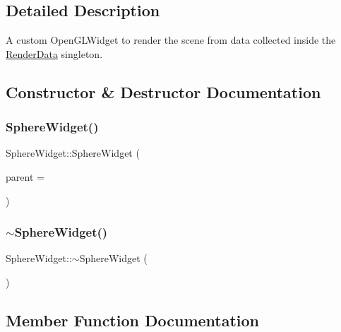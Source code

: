 \subsection{Detailed Description}
A custom Open\+G\+L\+Widget to render the scene from data collected inside the \hyperlink{class_render_data}{Render\+Data} singleton. 

\subsection{Constructor \& Destructor Documentation}
\mbox{\label{class_sphere_widget_a6ee7b3a4b58e5d62fb1c901aafdd1790}} 
\subsubsection{\texorpdfstring{Sphere\+Widget()}{SphereWidget()}}
{\footnotesize\ttfamily Sphere\+Widget\+::\+Sphere\+Widget (\begin{DoxyParamCaption}\item[{Q\+Widget $\ast$}]{parent = {} }\end{DoxyParamCaption})}

\mbox{\label{class_sphere_widget_a1766e5d68f4c57f52d6b1ee40cc0326c}} 
\subsubsection{\texorpdfstring{$\sim$\+Sphere\+Widget()}{~SphereWidget()}}
{\footnotesize\ttfamily Sphere\+Widget\+::$\sim$\+Sphere\+Widget (\begin{DoxyParamCaption}{ }\end{DoxyParamCaption})\hspace{0.3cm}{\ttfamily [inline]}}



\subsection{Member Function Documentation}
\mbox{\label{class_sphere_widget_a323d335cf261b7156da1a59aaf28c40c}} 
